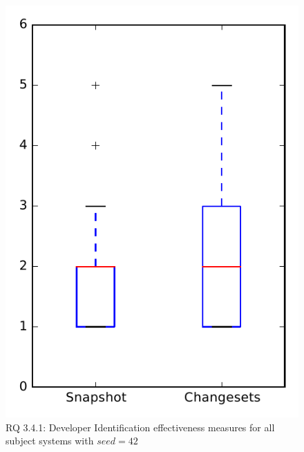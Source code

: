 
\begin{figure}
\centering
\includegraphics[height=0.4\textheight]{figures/dit_seed/rq1_overview_42}
\caption{RQ 3.4.1: Developer Identification effectiveness measures for all subject systems with $seed=42$}
\label{fig:dit_seed:rq1:overview}
\end{figure}
